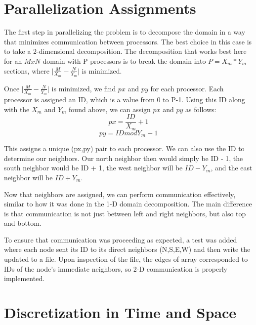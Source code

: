 \documentclass{article}
\begin{document}

\section{Parallelization Assignments}

The first step in parallelizing the problem is to decompose the domain in a way that minimizes communication between processors. The best choice in this case is to take a 2-dimensional decomposition. The decomposition that works best here for an \(MxN\) domain with P processors is to break the domain into \(P = X_{m} * Y_{m}\) sections, where
\(\bigg|\frac{M}{X_{m}} - \frac{N}{Y_{m}}\bigg|\) is minimized. 

Once \(\bigg|\frac{M}{X_{m}} - \frac{N}{Y_{m}}\bigg|\) is minimized, we find \(px\) and \(py\) for each processor. Each processor is assigned an ID, which is a value from 0 to P-1. Using this ID along with the \(X_{m}\) and \(Y_{m}\) found above, we can assign \(px\) and \(py\) as follows:
\[
px = \frac{ID}{X_{m}} + 1
\]
\[
py = ID mod Y_{m} + 1
\]

This assigns a unique (px,py) pair to each processor. We can also use the ID to determine our neighbors. Our north neighbor then would simply be ID - 1, the south neighbor would be ID + 1, the west neighbor will be \(ID - Y_{m}\), and the east neighbor will be \(ID + Y_{m}\).

Now that neighbors are assigned, we can perform communication effectively, similar to how it was done in the 1-D domain decomposition. The main difference is that communication is not just between left and right neighbors, but also top and bottom.

To ensure that communication was proceeding as expected, a test was added where each node sent its ID to its direct neighbors (N,S,E,W) and then write the updated to a file. Upon inspection of the file, the edges of array corresponded to IDs of the node's immediate neighbors, so 2-D communication is properly implemented.

\section{Discretization in Time and Space}
\end{document}
